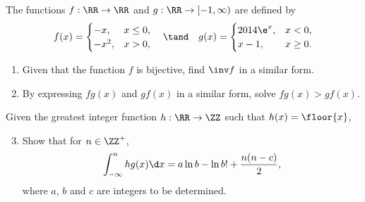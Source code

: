 \clearpage
\begin{problem}
    The functions $f : \RR \to \RR$ and $g : \RR \to [-1, \infty)$ are defined by \[f(x) = \begin{cases}-x , & x \leq 0,\\-x^2, & x> 0,\end{cases} \quad \tand \quad g(x) = \begin{cases}2014 \e^x, & x < 0, \\ x-1, & x \geq 0.\end{cases}\]

    \begin{enumerate}
        \item Given that the function $f$ is bijective, find $\inv f$ in a similar form.
        \item By expressing $fg(x)$ and $gf(x)$ in a similar form, solve $fg(x) > gf(x)$.
    \end{enumerate}

    Given the greatest integer function $h : \RR \to \ZZ$ such that $h(x) = \floor{x}$,
    \begin{enumerate}
        \setcounter{enumi}{2}
        \item Show that for $n \in \ZZ^+$, \[\int_{-\infty}^n hg(x) \d x = a \ln b - \ln{b!} + \frac{n(n-c)}{2},\] where $a$, $b$ and $c$ are integers to be determined.
    \end{enumerate}
\end{problem}
